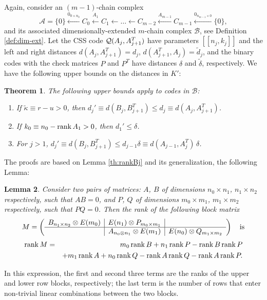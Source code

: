 \documentclass[aps,prb,12pt,tightenlines,%
notitlepage,longbibliography]{revtex4-1}
\newtheorem{theorem}{Theorem}
\newtheorem{lemma}[theorem]{Lemma}
\begin{document}
Again, consider an $(m-1)$-chain complex
$$\mathcal{A}=\{0\}\stackrel{0_{0\times n_0}}\leftarrow C_0\stackrel{A_1}\leftarrow
C_1\leftarrow\ldots\leftarrow C_{m-2}\stackrel{A_{m-1}}\leftarrow
C_{m-1}\stackrel{0_{ n_{m-1}\times 0}}\leftarrow \{0\},$$ and its
associated dimensionally-extended $m$-chain complex $\mathcal{B}$, see
Definition \ref{def:dim-ext}.  Let the CSS code
${\cal Q}(A_j,A_{j+1}^T)$ have parameters $[[n_j,k_j]]$ and the left
and right distances $d(A_j,A_{j+1}^T)=d_j$,
$d(A_{j+1}^T,A_j)=\tilde{d}_j$, and the binary codes with the check
matrices $P$ and $P^T$ have distances ${\delta}$ and $\tilde{\delta}$,
respectively.  We have the following upper bounds on the distances in
$K'$:
\begin{theorem}
  \label{th:upper-distance-bnd}
The following upper bounds apply to codes in $\mathcal{B}$: 
  \begin{enumerate}[label=(\alph*)]
  \item If $\tilde{\kappa}\equiv r-u>0$, then
    $d_j'\equiv d(B_j,B_{j+1}^T)\le d_j\equiv d(A_j,A_{j+1}^T)$.
  \item If $k_0\equiv n_0-\mathop{\rm rank} A_1>0$, then $d_1'\le \delta$.
  \item For $j>1$,
    $d_j'\equiv d(B_j,B_{j+1}^T)\le d_{j-1}\delta\equiv
    d(A_{j-1},A_{j}^T)\,\delta$.
  \end{enumerate}
\end{theorem}
The proofs are based on Lemma \ref{th:rankBj} and its 
generalization, the following Lemma:
\begin{lemma}
  \label{th:rank-3col}
  Consider two pairs of matrices: $A$, $B$ of dimensions
  $n_0\times n_1$, $n_1\times n_2$ respectively, such that $AB=0$, and
  $P$, $Q$ of dimensions $m_0\times m_1$, $m_1\times m_2$
  respectively, such that $PQ=0$.  Then the rank of the following
  block matrix
$$
M=\left(
  \begin{array}[c]{c|c|c} B_{n_1 \times n_2}\otimes E(m_0) &
    E(n_1)\otimes P_{m_0\times m_1} & \\ \hline & A_{n_0\otimes
      n_1}\otimes E(m_1) & E(n_0)\otimes Q_{m_1\times m_2}
  \end{array}
\right)\quad \text{is}
$$
\begin{eqnarray*}
  \mathop{\rm rank} M&=&m_0\mathop{\rm rank} B+n_1\mathop{\rm rank} P-\mathop{\rm rank} B\mathop{\rm rank} P \\ 
         & & + m_1\mathop{\rm rank} A+n_0\mathop{\rm rank} Q-\mathop{\rm rank} A\mathop{\rm rank} Q-\mathop{\rm rank} A\mathop{\rm rank} P. 
\label{eq:1}
\end{eqnarray*}
\end{lemma}
In this expression, the first and second three terms are the ranks of
the upper and lower row blocks, respectively; the last term is the
number of rows that enter non-trivial linear combinations between the
two blocks.
\end{document}
